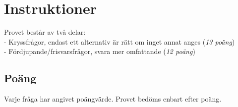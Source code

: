 \documentclass{exam}
\begin{document}
\section*{Instruktioner}
Provet består av två delar:\\
- Kryssfrågor, endast ett alternativ är rätt om inget annat anges (\textit{13 poäng})\\
- Fördjupande/frisvarsfrågor, svara mer omfattande (\textit{12 poäng})

\subsection*{Poäng}
Varje fråga har angivet poängvärde. Provet bedöms enbart efter poäng.\\

\vspace{5mm}
\begin{center}
\end{center}
\vspace{5mm}
\end{document}
